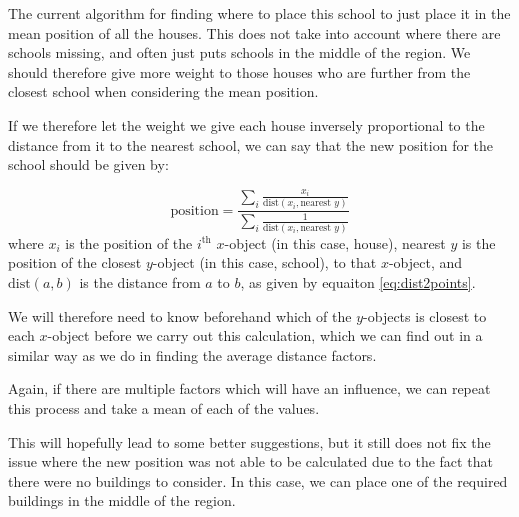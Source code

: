 \documentclass[12pt]{report}
\begin{document}
The current algorithm for finding where to place this school to just place it in the mean position of all the houses. This does not take into account where there are schools missing, and often just puts schools in the middle of the region. We should therefore give more weight to those houses who are further from the closest school when considering the mean position.

If we therefore let the weight we give each house inversely proportional to the distance from it to the nearest school, we can say that the new position for the school should be given by:

\begin{equation}\label{eq:newPos}
    \text{position}=\frac{\displaystyle\sum_{i}\displaystyle\frac{x_i}{\text{dist}\left(x_i,\text{nearest }y\right)}}{\displaystyle\sum_{i}\displaystyle\frac{1}{\text{dist}\left(x_i,\text{nearest }y\right)}}
\end{equation}
where $x_i$ is the position of the $i^\text{th}$ $x$-object (in this case, house), nearest $y$ is the position of the closest $y$-object (in this case, school), to that $x$-object, and $\text{dist}\left(a,b\right)$ is the distance from $a$ to $b$, as given by equaiton \ref{eq:dist2points}.

We will therefore need to know beforehand which of the $y$-objects is closest to each $x$-object before we carry out this calculation, which we can find out in a similar way as we do in finding the average distance factors.

Again, if there are multiple factors which will have an influence, we can repeat this process and take a mean of each of the values.

This will hopefully lead to some better suggestions, but it still does not fix the issue where the new position was not able to be calculated due to the fact that there were no buildings to consider. In this case, we can place one of the required buildings in the middle of the region.
\end{document}
